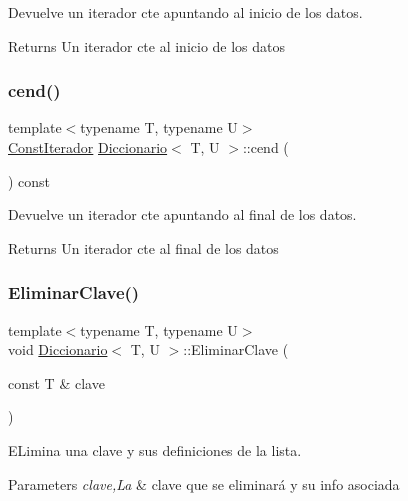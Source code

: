 Devuelve un iterador cte apuntando al inicio de los datos. 

\begin{DoxyReturn}{Returns}
Un iterador cte al inicio de los datos 
\end{DoxyReturn}
\mbox{\label{classDiccionario_ad1e6e51c6a40b96d23d41cd2b67706db}} 
\subsubsection{\texorpdfstring{cend()}{cend()}}
{\footnotesize\ttfamily template$<$typename T, typename U$>$ \\
\hyperlink{classDiccionario_1_1ConstIterador}{Const\+Iterador} \hyperlink{classDiccionario}{Diccionario}$<$ T, U $>$\+::cend (\begin{DoxyParamCaption}{ }\end{DoxyParamCaption}) const\hspace{0.3cm}{\ttfamily [inline]}}



Devuelve un iterador cte apuntando al final de los datos. 

\begin{DoxyReturn}{Returns}
Un iterador cte al final de los datos 
\end{DoxyReturn}
\mbox{\label{classDiccionario_ad08c3ef443de483ad26bd2b51121dfb8}} 
\subsubsection{\texorpdfstring{Eliminar\+Clave()}{EliminarClave()}}
{\footnotesize\ttfamily template$<$typename T, typename U$>$ \\
void \hyperlink{classDiccionario}{Diccionario}$<$ T, U $>$\+::Eliminar\+Clave (\begin{DoxyParamCaption}\item[{const T \&}]{clave }\end{DoxyParamCaption})}



E\+Limina una clave y sus definiciones de la lista. 


\begin{DoxyParams}{Parameters}
{\em clave,La} & clave que se eliminará y su info asociada \\
\hline
\end{DoxyParams}
\mbox{\label{classDiccionario_acbb1820c2df57594ad102183d77e5331}} 
